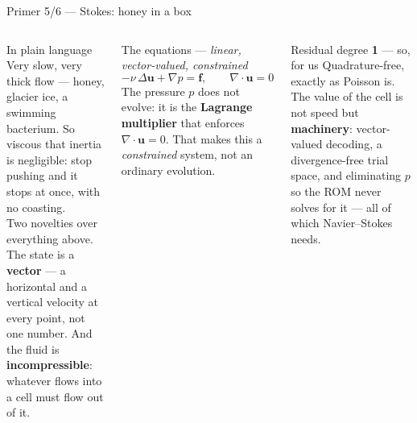 \documentclass[10pt,aspectratio=169]{beamer}
\begin{document}
\begin{frame}{Primer 5/6 --- Stokes: honey in a box}
  \footnotesize
  \begin{columns}[T]
    \begin{block}{In plain language}
      Very slow, very thick flow --- honey, glacier ice, a swimming bacterium. So viscous that
      inertia is negligible: stop pushing and it stops at once, with no coasting.\\[3pt]
      Two novelties over everything above. The state is a \textbf{vector} --- a horizontal and a
      vertical velocity at every point, not one number. And the fluid is \textbf{incompressible}:
      whatever flows into a cell must flow out of it.
    \end{block}
    \begin{block}{The equations --- \emph{linear, vector-valued, constrained}}
      \[ -\nu\,\Delta \bm{u} + \nabla p = \bm{f},\qquad \nabla\!\cdot\!\bm{u} = 0 \]
      The pressure $p$ does not evolve: it is the \textbf{Lagrange multiplier} that enforces
      $\nabla\!\cdot\!\bm{u}=0$. That makes this a \emph{constrained} system, not an ordinary
      evolution.
    \end{block}
    \begin{exampleblock}{Residual degree \textbf{1} --- so, for us}
      Quadrature-free, exactly as Poisson is. The value of the cell is not speed but
      \textbf{machinery}: vector-valued decoding, a divergence-free trial space, and eliminating
      $p$ so the ROM never solves for it --- all of which Navier--Stokes needs.
    \end{exampleblock}
  \end{columns}
\end{frame}
\end{document}
